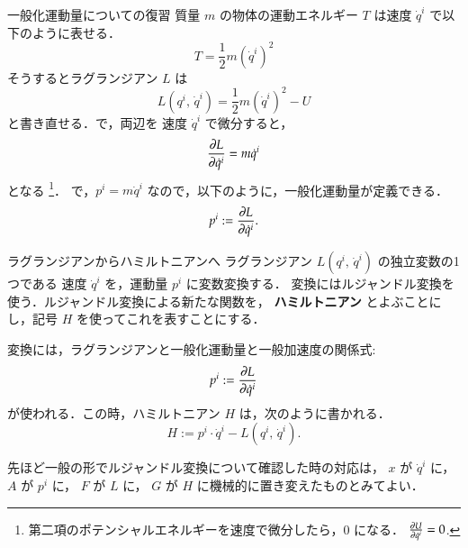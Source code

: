 \begin{mysmallsec}{一般化運動量についての復習}
                    質量 $m$ の物体の運動エネルギー $T$ は速度 ${\dot{q}}^{i}$ で以下のように表せる．
                        \begin{equation*}
                            T = \frac{1}{2} m \left( {\dot{q}}^{i} \right)^{2}
                        \end{equation*}
                    そうするとラグランジアン $L$ は
                        \begin{equation*}
                            L({q}^{i},\,\dot{q}^{i}) = \frac{1}{2} m \left( {\dot{q}}^{i} \right)^{2} - U
                        \end{equation*}
                    と書き直せる．で，両辺を 速度 ${\dot{q}}^{i}$ で微分すると，
                        \begin{equation*}
                            \frac{\partial L}{\partial {\dot{q}}^{i}} = m {\dot{q}}^{i}
                        \end{equation*}
                    となる
                        \footnote{
                            第二項のポテンシャルエネルギーを速度で微分したら，0 になる．
                            $\frac{\partial U}{\partial {\dot{q}}^{i}} = 0$.
                        }．
                    で，${p}^{i} = m {\dot{q}}^{i}$ なので，以下のように，一般化運動量が定義できる．
                        \begin{equation*}
                            {p}^{i} := \frac{\partial L}{\partial {\dot{q}}^{i}}.
                        \end{equation*}
                \end{mysmallsec}

                \begin{mysmallsec}{ラグランジアンからハミルトニアンへ}
                    ラグランジアン $L({q}^{i},\,{\dot{q}}^{i})$ の独立変数の1つである
                    速度 ${\dot{q}}^{i}$ を，運動量 ${p}^{i}$ に変数変換する．
                    変換にはルジャンドル変換を使う．ルジャンドル変換による新たな関数を，
                    \textbf{ハミルトニアン} とよぶことにし，記号 $H$ を使ってこれを表すことにする．

                    変換には，ラグランジアンと一般化運動量と一般加速度の関係式:
                        \begin{equation*}
                            {p}^{i} := \frac{\partial L}{\partial {\dot{q}}^{i}}
                        \end{equation*}
                    が使われる．この時，ハミルトニアン $H$ は，次のように書かれる．
                        \begin{equation*}
                            H := {p}^{i} \cdot \dot{q}^{i} - L({q}^{i},\,{\dot{q}}^{i}).
                        \end{equation*}

                    先ほど一般の形でルジャンドル変換について確認した時の対応は，
                    $x$ が $\dot{q}^{i}$ に，
                    $A$ が ${p}^{i}$ に，
                    $F$ が $L$ に，
                    $G$ が $H$ に機械的に置き変えたものとみてよい．
                \end{mysmallsec}

